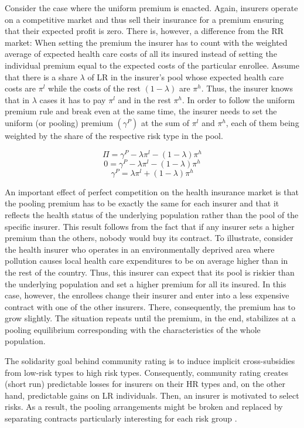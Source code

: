 \documentclass[12pt,english]{article}%
\makeatletter
\renewcommand{\subsection}{\@startsection{subsection}{2}{0mm}{-0.1\baselineskip}{0.5\baselineskip}{\normalfont\bf\flushleft}}
\makeatother
\begin{document}
Consider the case where the uniform premium is enacted. Again, insurers operate on a competitive market and thus sell their insurance for a premium ensuring that their expected profit is zero. There is, however, a difference from the RR market: When setting the premium the insurer has to count with the weighted average of expected health care costs of all its insured instead of setting the individual premium equal to the expected costs of the particular enrollee. Assume that there is a share $\lambda$ of LR in the insurer's pool whose expected health care costs are $\pi^l$ while the costs of the rest $(1-\lambda)$ are $\pi^h$. Thus, the insurer knows that in $\lambda$ cases it has to pay $\pi^l$ and in the rest $\pi^h$. In order to follow the uniform premium rule and break even at the same time, the insurer needs to set the uniform (or pooling) premium $(\gamma^P)$ at the sum of $\pi^l$ and $\pi^h$, each of them being weighted by the share of the respective risk type in the pool.

$$\Pi=\gamma^P-\lambda\pi^l-(1-\lambda)\pi^h$$ 
$$0=\gamma^P-\lambda\pi^l-(1-\lambda)\pi^h$$
$$\gamma^P=\lambda\pi^l+(1-\lambda)\pi^h$$

An important effect of perfect competition on the health insurance market is that the pooling premium has to be exactly the same for each insurer and that it reflects the health status of the underlying population rather than the pool of the specific insurer. This result follows from the fact that if any insurer sets a higher premium than the others, nobody would buy its contract. To illustrate, consider the health insurer who operates in an environmentally deprived area where pollution causes local health care expenditures to be on average higher than in the rest of the country. Thus, this insurer can expect that its pool is riskier than the underlying population and set a higher premium for all its insured. In this case, however, the enrollees change their insurer and enter into a less expensive contract with one of the other insurers. There, consequently, the premium has to grow slightly. The situation repeats until the premium, in the end, stabilizes at a pooling equilibrium corresponding with the characteristics of the whole population.


\subsection{Community rating with cream-skimming}
The solidarity goal behind community rating is to induce implicit cross-subsidies from low-risk types to high risk types. Consequently, community rating creates (short run) predictable losses for insurers on their HR types and, on the other hand, predictable gains on LR individuals. Then, an insurer is motivated to select risks. As a result, the pooling arrangements might be broken and replaced by separating contracts particularly interesting for each risk group \citep{deven2003}.
\end{document}
